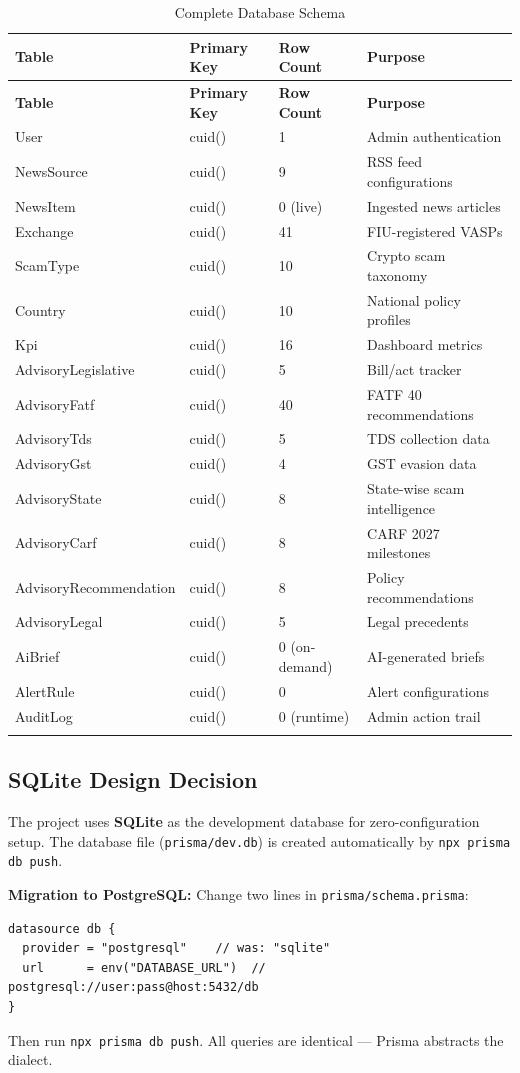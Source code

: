\documentclass[12pt,a4paper]{article}
\begin{document}
\begin{longtable}{p{3.5cm}p{3cm}p{2.5cm}p{4cm}}
\toprule
\textbf{Table} & \textbf{Primary Key} & \textbf{Row Count} & \textbf{Purpose} \\
\midrule
\endfirsthead
\toprule
\textbf{Table} & \textbf{Primary Key} & \textbf{Row Count} & \textbf{Purpose} \\
\midrule
\endhead
User & cuid() & 1 & Admin authentication \\
NewsSource & cuid() & 9 & RSS feed configurations \\
NewsItem & cuid() & 0 (live) & Ingested news articles \\
Exchange & cuid() & 41 & FIU-registered VASPs \\
ScamType & cuid() & 10 & Crypto scam taxonomy \\
Country & cuid() & 10 & National policy profiles \\
Kpi & cuid() & 16 & Dashboard metrics \\
AdvisoryLegislative & cuid() & 5 & Bill/act tracker \\
AdvisoryFatf & cuid() & 40 & FATF 40 recommendations \\
AdvisoryTds & cuid() & 5 & TDS collection data \\
AdvisoryGst & cuid() & 4 & GST evasion data \\
AdvisoryState & cuid() & 8 & State-wise scam intelligence \\
AdvisoryCarf & cuid() & 8 & CARF 2027 milestones \\
AdvisoryRecommendation & cuid() & 8 & Policy recommendations \\
AdvisoryLegal & cuid() & 5 & Legal precedents \\
AiBrief & cuid() & 0 (on-demand) & AI-generated briefs \\
AlertRule & cuid() & 0 & Alert configurations \\
AuditLog & cuid() & 0 (runtime) & Admin action trail \\
\bottomrule
\caption{Complete Database Schema}
\label{tab:schema}
\end{longtable}

\subsection{SQLite Design Decision}

\begin{infobox}
The project uses \textbf{SQLite} as the development database for zero-configuration setup. The database file (\texttt{prisma/dev.db}) is created automatically by \texttt{npx prisma db push}.

\textbf{Migration to PostgreSQL:} Change two lines in \texttt{prisma/schema.prisma}:
\begin{verbatim}
datasource db {
  provider = "postgresql"    // was: "sqlite"
  url      = env("DATABASE_URL")  // postgresql://user:pass@host:5432/db
}
\end{verbatim}
Then run \texttt{npx prisma db push}. All queries are identical — Prisma abstracts the dialect.
\end{infobox}
\end{document}
